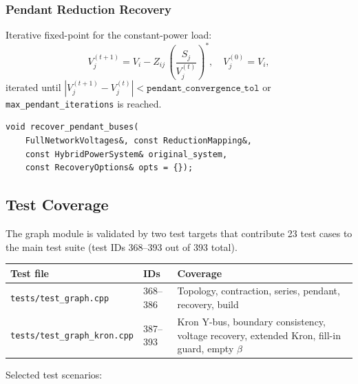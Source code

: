 \subsubsection{Pendant Reduction Recovery}

Iterative fixed-point for the constant-power load:
\begin{equation}
  V_j^{(t+1)} = V_i - Z_{ij}\,\left(\frac{S_j}{V_j^{(t)}}\right)^{\!\!*},
  \quad V_j^{(0)} = V_i,
  \label{eq:rec-pendant}
\end{equation}
iterated until $|V_j^{(t+1)} - V_j^{(t)}| < \texttt{pendant\_convergence\_tol}$
or \texttt{max\_pendant\_iterations} is reached.

\begin{verbatim}
void recover_pendant_buses(
    FullNetworkVoltages&, const ReductionMapping&,
    const HybridPowerSystem& original_system,
    const RecoveryOptions& opts = {});
\end{verbatim}

\subsection{Test Coverage}
\label{sec:graph-tests}

The graph module is validated by two test targets that contribute 23 test
cases to the main test suite (test IDs 368--393 out of 393 total).

\begin{center}
\begin{tabular}{llp{6.2cm}}
\hline\hline
\textbf{Test file} & \textbf{IDs} & \textbf{Coverage} \\
\hline
\texttt{tests/test\_graph.cpp}      & 368--386 & Topology, contraction, series,
                                                  pendant, recovery, build \\
\texttt{tests/test\_graph\_kron.cpp}& 387--393 & Kron Y-bus, boundary consistency,
                                                  voltage recovery, extended Kron,
                                                  fill-in guard, empty $\beta$ \\
\hline\hline
\end{tabular}
\end{center}

Selected test scenarios:

